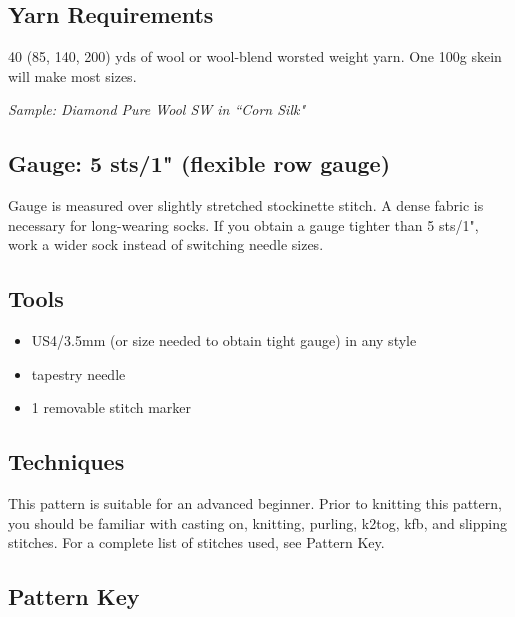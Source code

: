 \documentclass[12pt]{article}
\begin{document}
\begin{titlingpage}
\begin{multicols}{2}
\subsection*{Yarn Requirements}

40 (85, 140, 200) yds of wool or wool-blend worsted weight yarn. One 100g skein will make most sizes.

\emph{Sample: Diamond Pure Wool SW in ``Corn Silk"}

\subsection*{Gauge: 5 sts/1" (flexible row gauge)}

Gauge is measured over slightly stretched stockinette stitch. A dense fabric is necessary for long-wearing socks. If you obtain a gauge tighter than 5 sts/1", work a wider sock instead of switching needle sizes.

\subsection*{Tools}

\begin{itemize}
\item US4/3.5mm (or size needed to obtain tight gauge) in any style %
\item tapestry needle
\item 1 removable stitch marker%
\end{itemize}

\subsection*{Techniques}

This pattern is suitable for an advanced beginner. %
Prior to knitting this pattern, you should be familiar with casting on, knitting, purling, k2tog, kfb, and slipping stitches. %
For a complete list of stitches used, see Pattern Key.


\subsection*{Pattern Key}


\end{multicols}
\end{titlingpage}
\end{document}

